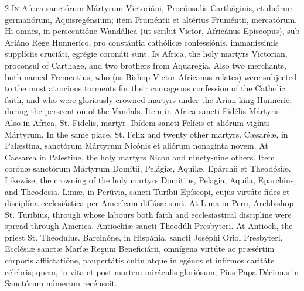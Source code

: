 \begin{paracol}{2}
\lettrine[lines=2]{I}{n} Africa sanctórum Mártyrum Victoriáni, Procónsulis Cartháginis, et duórum 
 germanórum, Aquisregénsium; item Fruméntii et altérius Fruméntii, mercatórum. 
 Hi omnes, in persecutióne Wandálica (ut scribit Victor, Africánus Epíscopus), 
 sub Ariáno Rege Hunneríco, pro constántia 
 cathólicæ confessiónis, immaníssimis supplíciis cruciáti, egrégie coronáti 
 sunt.
\switchcolumn
{}
\lettrine[lines=2]{I}{n} Africa, the holy martyrs Victorian, proconsul of Carthage, and two 
 brothers from Aquaregia. Also two merchants, both named Frementius, 
 who (as Bishop Victor Africanus relates) were subjected to the most 
 atrocious torments for their courageous confession of the Catholic faith, 
 and who were gloriously crowned martyrs under the Arian king Hunneric, 
 during the persecution of the Vandals.
\switchcolumn*
{}
Item in Africa sancti Fidélis Mártyris.
\switchcolumn
{}
Also in Africa, St. Fidelis, martyr.
\switchcolumn*
{}
Ibídem sancti Felícis et aliórum vigínti Mártyrum.
\switchcolumn
{}
In the same place, St. Felix and twenty other martyrs.
\switchcolumn*
{}
Cæsaréæ, in Palæstína, sanctórum Mártyrum 
 Nicónis et aliórum nonagínta novem.
\switchcolumn
{}
At Caesarea in Palestine, the holy martyrs Nicon and ninety-nine others.
\switchcolumn*
{}
Item corónæ sanctórum Mártyrum Domítii, Pelágiæ, 
 Aquilæ, Epárchii et Theodósiæ.
\switchcolumn
{}
Likewise, the crowning of the holy martyrs Domitius, Pelagia, Aquila, 
 Eparchius, and Theodosia.
\switchcolumn*
{}
Limæ, in Perúvia, sancti Turíbii Epíscopi, 
 cujus virtúte fides et disciplína ecclesiástica per Amerícam diffúsæ sunt.
\switchcolumn
{}
At Lima in Peru, Archbishop St. Turibius, through whose labours both faith 
 and ecclesiastical discipline were spread through America.
\switchcolumn*
{}
Antiochíæ sancti Theodúli Presbyteri.
\switchcolumn
{}
At Antioch, the priest St. Theodulus.
\switchcolumn*
{}
Barcinóne, in Hispánia, sancti Joséphi Oriol Presbyteri, Ecclésiæ 
 sanctæ Maríæ Regum Beneficiárii, omnígena virtúte ac præsértim córporis 
 afflictatióne, paupertátis cultu atque in egénos et infírmos caritáte 
 célebris; quem, in vita et post mortem miráculis gloriósum, Pius Papa 
 Décimus in Sanctórum númerum recénsuit.

\end{paracol}
